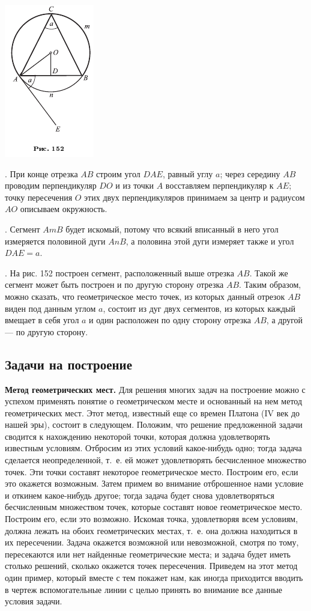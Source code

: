 \documentclass[oneside]{book}
\begin{document}
\includegraphics{pics/ris-152}

.
При конце отрезка $AB$ строим угол $DAE$, равный углу $a$;
через середину $AB$ проводим перпендикуляр $DO$ и из точки $A$ восставляем перпендикуляр к $AE$;
точку пересечения $O$ этих двух перпендикуляров принимаем за центр и радиусом $AO$ описываем окружность.

.
Сегмент $AmB$ будет искомый, потому что всякий вписанный в него угол измеряется половиной дуги $AnB$, а половина этой дуги измеряет также и угол $DAE=a$.

.
На рис. 152 построен сегмент, расположенный выше отрезка $AB$.
Такой же сегмент может быть построен и по другую сторону отрезка $AB$.
Таким образом, можно сказать, что геометрическое место точек, из которых данный отрезок $AB$ виден под данным углом $a$, состоит из дуг двух сегментов, из которых каждый вмещает в себя угол $a$ и один расположен по одну сторону отрезка $AB$, а другой — по другую сторону.

\subsection*{Задачи на построение}

\textbf{Метод геометрических мест.}
Для решения многих задач на построение можно с успехом применять понятие о геометрическом месте и основанный на нем метод геометрических мест.
Этот метод, известный еще со времен Платона (IV век до нашей эры), состоит в следующем.
Положим, что решение предложенной задачи сводится к нахождению некоторой точки, которая должна удовлетворять известным условиям.
Отбросим из этих условий какое-нибудь одно;
тогда задача сделается неопределенной, т.~е. ей может удовлетворять бесчисленное множество точек.
Эти точки составят некоторое геометрическое место.
Построим его, если это окажется возможным.
Затем примем во внимание отброшенное нами условие и откинем какое-нибудь другое;
тогда задача будет снова удовлетворяться бесчисленным множеством точек, которые составят новое геометрическое место.
Построим его, если это возможно.
Искомая точка, удовлетворяя всем условиям, должна лежать на обоих геометрических местах, т.~е. она должна находиться в их пересечении.
Задача окажется возможной или невозможной, смотря по тому, пересекаются или нет найденные геометрические места;
и задача будет иметь столько решений, сколько окажется точек пересечения.
Приведем на этот метод один пример, который вместе с тем покажет нам, как иногда приходится вводить в чертеж вспомогательные линии с целью принять во внимание все данные условия задачи.
\end{document}

